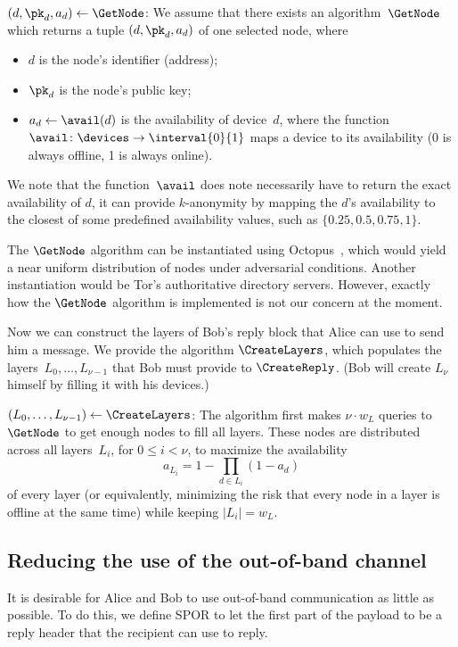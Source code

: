 \((d, \pk_d, a_d)\gets \GetNode\): We assume that there exists an 
algorithm~\(\GetNode\) which returns a tuple \((d, \pk_d, a_d)\) of one 
selected node, where
\begin{itemize}
  \item \(d\) is the node's identifier (address);
  \item \(\pk_d\) is the node's public key;
  \item \(a_d\gets \avail(d)\) is the availability of device~\(d\), where the 
    function~\(\avail\colon \devices\to \interval{0}{1}\) maps a device to its 
    availability (0 is always offline, 1 is always online).
\end{itemize}
We note that the function~\(\avail\) does note necessarily have to return the 
exact availability of \(d\), \eg it can provide \(k\)-anonymity by mapping the 
\(d\)'s availability to the closest of some predefined availability values, 
such as \(\{0.25, 0.5, 0.75, 1\}\).

The \(\GetNode\) algorithm can be instantiated using \eg
Octopus~\cite{Octopus}, which would yield a near uniform distribution of nodes 
under adversarial conditions.
Another instantiation would be Tor's authoritative directory servers.
However, exactly how the \(\GetNode\) algorithm is implemented is not our 
concern at the moment.

Now we can construct the layers of Bob's reply block that Alice can use to send 
him a message.
We provide the algorithm \(\CreateLayers\), which populates the layers~\(L_0, 
\dotsc, L_{\nu-1}\) that Bob must provide to \(\CreateReply\).
(Bob will create \(L_\nu\) himself by filling it with his devices.)

\((L_0, \dotsc, L_{\nu-1}) \gets \CreateLayers\):
The algorithm first makes \(\nu\cdot w_L\) queries to \(\GetNode\) to get 
enough nodes to fill all layers.
These nodes are distributed across all layers~\(L_i\), for \(0\leq i < \nu\), 
to maximize the availability~\[
  a_{L_i} = 1 - \prod_{d\in L_i} (1-a_d)
\] of every layer (or equivalently, minimizing the risk that every node in a 
layer is offline at the same time) while keeping \(|L_i| = w_L\).

\subsection{Reducing the use of the out-of-band channel}

It is desirable for Alice and Bob to use out-of-band communication as little as 
possible.
To do this, we define \ac{SPOR} to let the first part of the payload to be a 
reply header that the recipient can use to reply.
